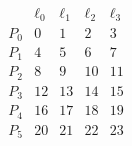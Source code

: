 $$
\begin{array}{c|cccc}
& \ell_0 & \ell_1 & \ell_2 & \ell_3 \\
\hline
P_0 & 0 & 1 & 2 & 3 \\
P_1 & 4 & 5 & 6 & 7 \\
P_2 & 8 & 9 & 10 & 11 \\
P_3 & 12 & 13 & 14 & 15 \\
P_4 & 16 & 17 & 18 & 19 \\
P_5 & 20 & 21 & 22 & 23 \\
\end{array}
$$
